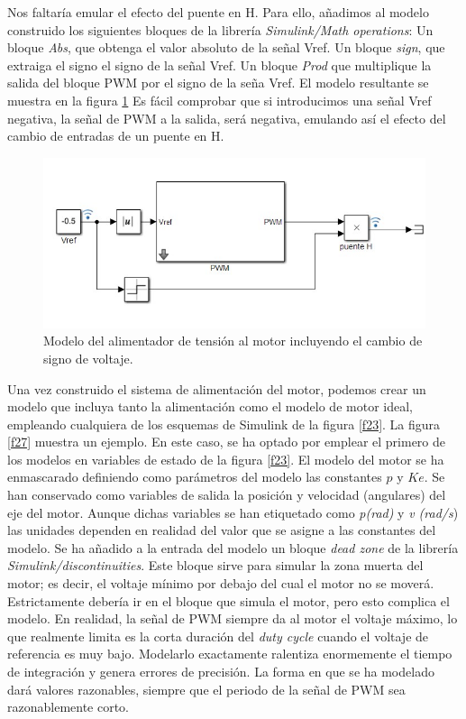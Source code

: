 \documentclass[10pt,a4paper]{report}
\begin{document}
Nos faltaría emular el efecto del puente en H. Para ello, añadimos al modelo construido los siguientes bloques de la librería \emph{Simulink/Math operations}: Un bloque \emph{Abs}, que obtenga el valor absoluto de la señal Vref. Un bloque \emph{sign}, que extraiga el signo el signo de la señal Vref. Un bloque \emph{Prod} que multiplique la salida del bloque PWM por el signo de la seña Vref. El modelo resultante se muestra en la figura \ref{f26} Es fácil comprobar que si introducimos una señal Vref negativa, la señal de PWM a la salida, será negativa, emulando así el efecto del cambio de entradas de un puente en H.
\begin{figure}
\centering
\includegraphics[scale=1]{puenteH.jpg}
\caption{Modelo del alimentador de tensión al motor incluyendo el cambio de signo de voltaje.}
\label{f26}
\end{figure}

Una vez construido el sistema de alimentación del motor, podemos crear un modelo que incluya tanto la alimentación como el modelo de motor ideal, empleando cualquiera de los esquemas de Simulink de la figura \ref{f23}. La figura \ref{f27} muestra un ejemplo. En este caso, se ha optado por emplear el primero de los modelos en variables de estado de la figura \ref{f23}. El modelo del motor se ha enmascarado definiendo como parámetros del modelo las constantes $p$ y $Ke$. Se han conservado como variables de salida la posición y velocidad (angulares) del eje del motor. Aunque dichas variables se han etiquetado como \emph{p(rad)} y \emph{v (rad/s}) las unidades dependen en realidad del valor que se asigne a las constantes del modelo. Se ha añadido a la entrada del modelo un bloque \emph{dead zone} de la librería \emph{ Simulink/discontinuities}. Este bloque sirve para simular la zona muerta del motor; es decir, el voltaje mínimo por debajo del cual el motor no se moverá. Estrictamente debería ir en el bloque que simula el motor, pero esto complica el modelo. En realidad, la señal de PWM siempre da al motor el voltaje máximo, lo que realmente limita es la corta duración del \emph{duty cycle} cuando el voltaje de referencia es muy bajo. Modelarlo exactamente ralentiza enormemente el tiempo de integración y genera errores de precisión. La forma en que se ha modelado dará valores razonables, siempre que el periodo de la señal de PWM sea razonablemente corto.
\end{document}
